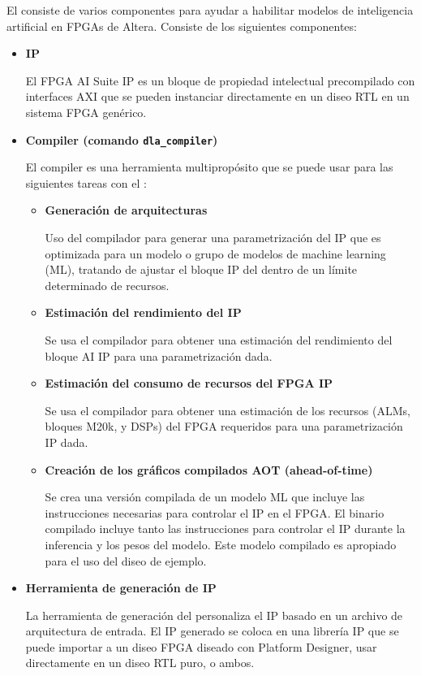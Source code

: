     El \ais consiste de varios componentes para ayudar a habilitar modelos de inteligencia artificial en FPGAs de Altera. Consiste de los siguientes componentes:
    \begin{itemize}
        \item \textbf{IP}  
        
        El FPGA AI Suite IP es un bloque de propiedad intelectual precompilado con interfaces AXI que se pueden instanciar directamente en un dise\n o RTL en un sistema FPGA gen\'erico.
        \item \textbf{Compiler (comando \texttt{dla\_compiler})}    
        
        El \ais compiler es una herramienta multiprop\'osito que se puede usar para las siguientes tareas con el \ais:
        \begin{itemize}
            \item \textbf{Generaci\'on de arquitecturas} 
            
            Uso del compilador para generar una parametrizaci\'on del IP que es optimizada para un modelo o grupo de modelos de machine learning (ML), tratando de ajustar el bloque IP del \ais dentro de un l\'imite determinado de recursos.
            \item \textbf{Estimaci\'on del rendimiento del IP}
            
            Se usa el compilador para obtener una estimaci\'on del rendimiento del bloque AI IP para una parametrizaci\'on dada.
            \item \textbf{Estimaci\'on del consumo de recursos del FPGA IP} 
            
            Se usa el compilador para obtener una estimaci\'on de los recursos (ALMs, bloques M20k, y DSPs) del FPGA requeridos para una parametrizaci\'on IP dada.
            \item \textbf{Creaci\'on de los gr\'aficos compilados AOT (ahead-of-time)} 
            
            Se crea una versi\'on compilada de un modelo ML que incluye las instrucciones necesarias para controlar el IP en el FPGA. El binario compilado incluye tanto las instrucciones para controlar el IP durante la inferencia y los pesos del modelo. Este modelo compilado es apropiado para el uso del dise\n o de ejemplo.
        \end{itemize}
        \item \textbf{Herramienta de generaci\'on de IP} 
        
        La herramienta de generaci\'on del \ais personaliza el \ais IP basado en un archivo de arquitectura de entrada. El IP generado se coloca en una librer\'ia IP que se puede importar a un dise\n o FPGA dise\n ado con Platform Designer, usar directamente en un dise\n o RTL puro, o ambos.


\end{itemize}
